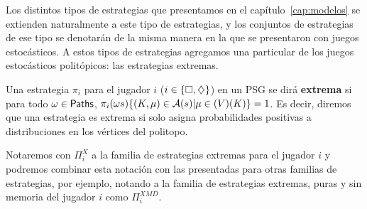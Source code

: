 Los distintos tipos de estrategias que presentamos en el
capítulo~\ref{cap:modelos} se extienden naturalmente a este tipo de
estrategias, y los conjuntos de estrategias de ese tipo se denotarán de la
misma manera en la que se presentaron con juegos estocásticos. A estos tipos de
estrategias agregamos una particular de los juegos estocásticos politópicos:
las estrategias extremas.

\begin{definition}
	Una estrategia $\pi_i$ para el jugador $i$ ($i \in \{\square, \diamondsuit\}$) en un PSG se dirá \textbf{extrema} si para todo $\omega \in \textsf{Paths}$, $\pi_i(\omega s)\{(K, \mu) \in \mathcal{A}(s)| \mu \in \mathbb(V)(K)\} = 1$. Es decir, diremos que una estrategia es extrema si solo asigna probabilidades positivas a distribuciones en los vértices del politopo.

	Notaremos con $\Pi_i^X$ a la familia de estrategias extremas para el jugador
	$i$ y podremos combinar esta notación con las presentadas para otras familias
	de estrategias, por ejemplo, notando a la familia de estrategias extremas,
	puras y sin memoria del jugador $i$ como $\Pi_i^{XMD}$.
\end{definition}




